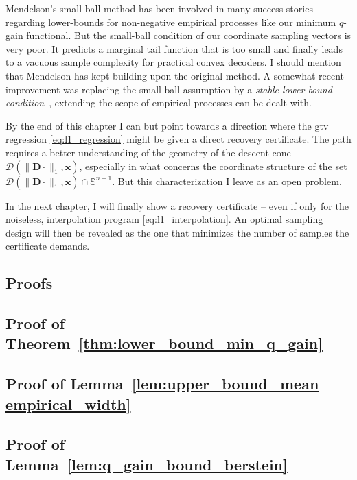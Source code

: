 Mendelson's small-ball method has been involved in many success stories regarding lower-bounds for non-negative empirical processes like our minimum $q$-gain functional. But the small-ball condition of our coordinate sampling vectors is very poor. It predicts a marginal tail function that is too small and finally leads to a vacuous sample complexity for practical convex decoders. I should mention that Mendelson has kept building upon the original method. A somewhat recent improvement was replacing the small-ball assumption by a \emph{stable lower bound condition}~\cite{mendelson2017}, extending the scope of empirical processes can be dealt with.

By the end of this chapter I can but point towards a direction where the \acrshort{gtv} regression \eqref{eq:l1_regression} might be given a direct recovery certificate. The path requires a better understanding of the geometry of the descent cone $\mathcal{D}( \|\mathbf{D} \cdot \|_1, \mathbf{x})$, especially in what concerns the coordinate structure of the set $\mathcal{D}( \|\mathbf{D} \cdot \|_1, \mathbf{x}) \cap \mathbb{S}^{n-1}$. But this characterization I leave as an open problem.

In the next chapter, I will finally show a recovery certificate -- even if only for the noiseless, interpolation program  \eqref{eq:l1_interpolation}. An optimal sampling design will then be revealed as the one that minimizes the number of samples the certificate demands.

\clearpage

\begin{subappendices}
    \section{Proofs}

    \subsection{Proof of Theorem~\ref{thm:lower_bound_min_q_gain}}
    \label{ap:proof_small_ball}
    

    \subsection{Proof of Lemma~\ref{lem:upper_bound_mean empirical_width}}
    \label{ap:proof_empirical_width_l1}
    

    \subsection{Proof of Lemma~\ref{lem:q_gain_bound_berstein}}
    \label{ap:proof_q_gain_bound_berstein}
    
\end{subappendices}